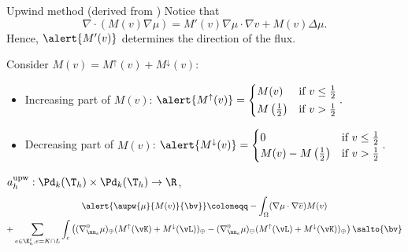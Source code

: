 \begin{frame}{Upwind method {\footnotesize (derived from \cite{acosta-soba_CH_2022})}}
	\footnotesize
	Notice that
	$$\nabla\cdot(M(v)\nabla\mu)=M'(v)\nabla\mu \cdot\nabla v+M(v)\Delta\mu.$$
	Hence, $\alert{M'(v)}$ determines the direction of the flux.
	
	\vspace*{0.3cm}
	
	Consider $M(v)=M^\uparrow(v)+M^\downarrow(v)$:
	\begin{itemize}
		\item Increasing part of $M(v)$: $\alert{M^\uparrow(v)}=
		\begin{cases}
			M(v) & \text{if }v\le \frac{1}{2}\\[0.2em]
			M\left(\frac{1}{2}\right) & \text{if } v>\frac{1}{2}
		\end{cases}.$
		\item Decreasing part of $M(v)$: $
		\alert{M^\downarrow(v)}=
		\begin{cases}
			0 & \text{if }v\le \frac{1}{2}\\
			M(v)-M\left(\frac{1}{2}\right) & \text{if } v>\frac{1}{2}
		\end{cases}.$
	\end{itemize}

	\begin{block}{}
	$a_h^{\text{upw}}:\Pd_k(\T_h)\times \Pd_k(\T_h)\to\R$,
	\scriptsize
	\begin{multline*}
		\alert{\aupw{\mu}{M(v)}{\bv}}\coloneqq-\int_\Omega (\nabla\mu\cdot\nabla\overline{v})M(v)\\+\sum_{e\in\E_h^i,e=K\cap L}\int_e\left((\nabla_{\nn_e}^0\mu)_{\oplus}(M^\uparrow(\vK)+M^\downarrow(\vL))_\oplus-(\nabla_{\nn_e}^0\mu)_{\ominus}(M^\uparrow(\vL)+M^\downarrow(\vK))_\oplus\right)\salto{\bv}
	\end{multline*}
	\end{block}
\end{frame}

